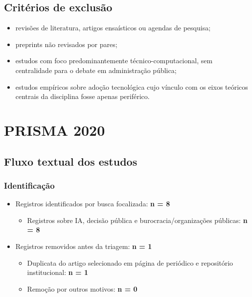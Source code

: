 \documentclass[12pt]{article}
\begin{document}
\subsection{Critérios de exclusão}
\label{sec:org072cb97}
\begin{itemize}
\item revisões de literatura, artigos ensaísticos ou agendas de pesquisa;
\item preprints não revisados por pares;
\item estudos com foco predominantemente técnico-computacional, sem centralidade para o debate em administração pública;
\item estudos empíricos sobre adoção tecnológica cujo vínculo com os eixos teóricos centrais da disciplina fosse apenas periférico.
\end{itemize}

\section{PRISMA 2020}
\label{sec:org583665e}

\subsection{Fluxo textual dos estudos}
\label{sec:org64238bb}

\subsubsection{Identificação}
\label{sec:org034e22f}
\begin{itemize}
\item Registros identificados por busca focalizada: \textbf{n = 8}
\begin{itemize}
\item Registros sobre IA, decisão pública e burocracia/organizações públicas: \textbf{n = 8}
\end{itemize}

\item Registros removidos antes da triagem: \textbf{n = 1}
\begin{itemize}
\item Duplicata do artigo selecionado em página de periódico e repositório institucional: \textbf{n = 1}
\item Remoção por outros motivos: \textbf{n = 0}
\end{itemize}
\end{itemize}
\end{document}
